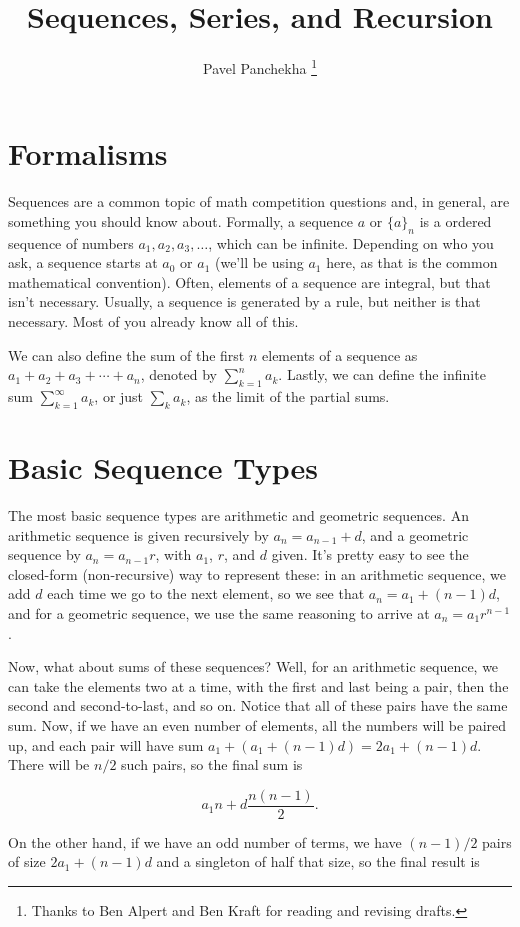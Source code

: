\documentclass[12pt,letterpaper]{article}
\author{Pavel Panchekha \thanks{Thanks to Ben Alpert and Ben Kraft for reading and revising drafts.}}
\title{Sequences, Series, and Recursion}
\begin{document}
\maketitle

\section{Formalisms}
Sequences are a common topic of math competition questions and, in
general, are something you should know about. Formally, a sequence $a$ or
$\{a\}_n$ is a ordered sequence of numbers $a_1, a_2, a_3, \ldots$, which
can be infinite. Depending on who you ask, a sequence starts at
$a_0$ or $a_1$ (we'll be using $a_1$ here, as that is the common
mathematical convention). Often, elements of a sequence are integral,
but that isn't necessary. Usually, a sequence is generated by a rule,
but neither is that necessary. Most of you already know all of this.

We can also define the sum of the first $n$ elements of a sequence as
$a_1 + a_2 + a_3 + \cdots + a_n$, denoted by $\sum_{k=1}^n a_k$.
Lastly, we can define the infinite sum $\sum_{k=1}^\infty a_k$, or
just $\sum_k a_k$, as the limit of the partial sums.

\section{Basic Sequence Types}
The most basic sequence types are arithmetic and geometric sequences.
An arithmetic sequence is given recursively by $a_n = a_{n-1} + d$,
and a geometric sequence by $a_n = a_{n-1} r$, with $a_1$, $r$, and
$d$ given. It's pretty easy to see the closed-form (non-recursive) way
to represent these: in an arithmetic sequence, we add $d$
each time we go to the next element, so we see that $a_n = a_1 + (n - 1)
d$, and for a geometric sequence, we use the same reasoning to arrive
at $a_n = a_1 r^{n - 1}$.

Now, what about sums of these sequences? Well, for an arithmetic
sequence, we can take the elements two at a time, with the first and
last being a pair, then the second and second-to-last, and so
on. Notice that all of these pairs have the same sum. Now, if we have
an even number of elements, all the numbers will be paired up, and each pair will have
sum $a_1 + (a_1 + (n - 1) d) = 2 a_1 + (n - 1) d$. There will be
$n/2$ such pairs, so the final sum is

$$a_1 n + d \frac{n (n-1)}{2}.$$

On the other hand, if we have an odd number of terms, we have
$(n-1)/2$ pairs of size $2 a_1 + (n - 1) d$ and a singleton of
half that size, so the final result is
\end{document}
